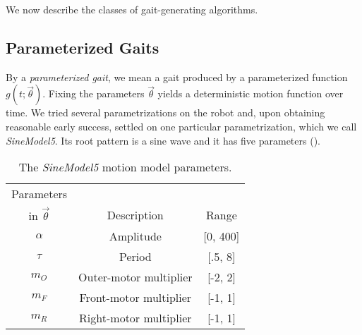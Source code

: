 

We now describe the classes of gait-generating algorithms.

\subsection{Parameterized Gaits}

By a \emph{parameterized gait}, we mean a gait produced by a
parameterized function $g(t; \vec{\theta})$. Fixing the parameters
$\vec{\theta}$ yields a deterministic motion function over time.  We
tried several parametrizations on the robot and, upon obtaining
reasonable early success, settled on one particular parametrization, which we call  \emph{SineModel5}. Its root pattern is a sine wave and it has five parameters ().

\newcommand{\amp}{\ensuremath{\alpha}}

\begin{table}[b]
\begin{center}
\begin{tabular}{|c|c|c|}
\hline
Parameters        &                           &       \\
in $\vec{\theta}$ & Description               & Range \\
\hline
\hline
\amp         & Amplitude                 & [0, 400] \\
\hline
$\tau$       & Period                    & [.5, 8] \\
\hline
$m_O$        & Outer-motor multiplier    & [-2, 2] \\
\hline
$m_F$        & Front-motor multiplier    & [-1, 1] \\
\hline
$m_R$        & Right-motor multiplier    & [-1, 1] \\
\hline
\end{tabular}
\caption{The \emph{SineModel5} motion model parameters.}
\label{tab:params}
\end{center}
\end{table}

